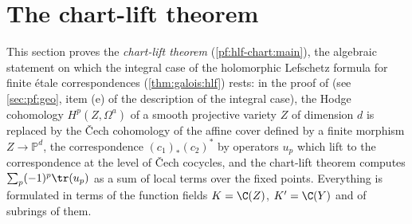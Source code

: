 \section{The chart-lift theorem}\label{sec:pf:hlf-chart}

\providecommand{\hlfcC}{\check{C}}
\providecommand{\hlfcH}{\check{H}}
\providecommand{\hlfcfib}{\Phi}
\providecommand{\hlfcloc}{\lambda}
\providecommand{\hlfcdl}{\operatorname{dlog}}
\providecommand{\hlfcres}{\operatorname{res}}
\providecommand{\hlfcmult}{\operatorname{m}}

This section proves the \emph{chart-lift theorem} (\cref{pf:hlf-chart:main}), the algebraic statement on which the integral case of
the holomorphic Lefschetz formula for finite \'etale correspondences (\cref{thm:galois:hlf}) rests: in the proof of
 (see \cref{sec:pf:geo}, item (e) of the description of the integral
case), the Hodge cohomology $H^p(Z,\Omega^a)$ of a smooth projective variety $Z$ of dimension $d$ is replaced by the \v{C}ech cohomology of the
affine cover defined by a finite morphism $Z\to\mathbb P^d$, the correspondence $(c_1)_*(c_2)^*$ by operators $u_p$ which lift to the
correspondence at the level of \v{C}ech cocycles, and the chart-lift theorem computes $\sum_p(-1)^p\tr(u_p)$ as a sum of local terms over the
fixed points. Everything is formulated in terms of the function fields $K=\C(Z)$, $K'=\C(Y)$ and of subrings of them.

